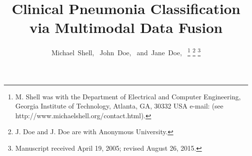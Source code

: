 \documentclass[journal]{IEEEtran}
\begin{document}
%
\title{Clinical Pneumonia Classification via Multimodal Data Fusion}
%
%
%

\author{Michael~Shell,~
        John~Doe,~
        and~Jane~Doe,~%
\thanks{M. Shell was with the Department
of Electrical and Computer Engineering, Georgia Institute of Technology, Atlanta,
GA, 30332 USA e-mail: (see http://www.michaelshell.org/contact.html).}%
\thanks{J. Doe and J. Doe are with Anonymous University.}%
\thanks{Manuscript received April 19, 2005; revised August 26, 2015.}}

% 
%
\end{document}

